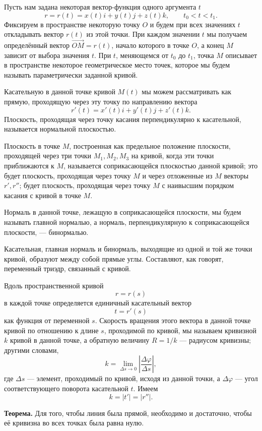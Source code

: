 \begin{rusblock}
Пусть нам задана некоторая вектор-функция одного аргумента $t$
\[
r=r(t)=x(t)i+y(t)j+z(t)k,\qquad t_0<t<t_1.
\]
Фиксируем в пространстве некоторую точку $O$ и будем при всех значениях $t$ откладывать вектор $r(t)$ из этой точки. При каждом значении $t$ мы получаем определённый вектор $\overrightarrow{OM}=r(t)$, начало которого в точке $O$, а конец $M$ зависит от выбора значения $t$. При $t$, меняющемся от $t_0$ до $t_1$, точка $M$ описывает в пространстве некоторое геометрическое место точек, которое мы будем называть параметрически заданной кривой.

Касательную в данной точке кривой $M(t)$ мы можем рассматривать как прямую, проходящую через эту точку по направлению вектора
\[
r'(t)=x'(t)i+y'(t)j+z'(t)k.
\]
Плоскость, проходящая через точку касания перпендикулярно к касательной, называется нормальной плоскостью.

Плоскость в точке $M$, построенная как предельное положение плоскости, проходящей через три точки $M_1,M_2,M_3$ на кривой, когда эти точки приближаются к $M$, называется соприкасающейся плоскостью данной кривой; это будет плоскость, проходящая через точку $M$ и через отложенные из $M$ векторы $r',r''$; будет плоскость, проходящая через точку $M$ с наивысшим порядком касания с кривой в точке $M$.

Нормаль в данной точке, лежащую в соприкасающейся плоскости, мы будем называть главной нормалью, а нормаль, перпендикулярную к соприкасающейся плоскости, --- бинормалью.

Касательная, главная нормаль и бинормаль, выходящие из одной и той же точки кривой, образуют между собой прямые углы. Составляют, как говорят, переменный триэдр, связанный с кривой.

Вдоль пространственной кривой
\[
r=r(s)
\]
в каждой точке определяется единичный касательный вектор
\[
t=r'(s)
\]
как функция от переменной $s$. Скорость вращения этого вектора в данной точке кривой по отношению к длине $s$, проходимой по кривой, мы называем кривизной $k$ кривой в данной точке, а обратную величину $R=1/k$ --- радиусом кривизны; другими словами,
\[
k=\lim_{\Delta s\to0}\left|\frac{\Delta\varphi}{\Delta s}\right|,
\]
где $\Delta s$ --- элемент, проходимый по кривой, исходя из данной точки, а $\Delta\varphi$ --- угол соответствующего поворота касательной $t$. Имеем
\[
k=|t'|=|r''|.
\]

\textbf{Теорема.} Для того, чтобы линия была прямой, необходимо и достаточно, чтобы её кривизна во всех точках была равна нулю.
\end{rusblock}


